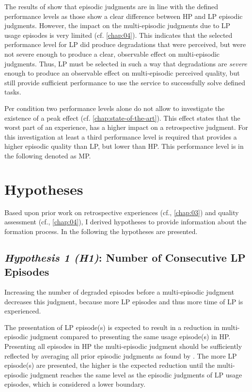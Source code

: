 The results of \cite{moller_single-call_2011} show that episodic judgments are in line with the defined performance levels as those show a clear difference between \ac{HP} and \ac{LP} episodic judgments.
However, the impact on the multi-episodic judgments due to \ac{LP} usage episodes is very limited (cf. \autoref{chap:04}).
This indicates that the selected performance level for \ac{LP} did produce degradations that were perceived, but were not severe enough to produce a clear, observable effect on multi-episodic judgments.
Thus, \ac{LP} must be selected in such a way that degradations are \emph{severe} enough to produce an observable effect on multi-episodic perceived quality, but still provide sufficient performance to use the service to successfully solve defined tasks.

Per condition two performance levels alone do not allow to investigate the existence of a peak effect (cf. \autoref{chap:state-of-the-art}).
This effect states that the worst part of an experience, has a higher impact on a retrospective judgment.
For this investigation at least a third performance level is required that provides a higher episodic quality than \ac{LP}, but lower than \ac{HP}.
This performance level is in the following denoted as \acf{MP}.

\section{Hypotheses}
Based upon prior work on retrospective experiences (cf., \autoref{chap:03}) and quality assessment (cf., \autoref{chap:04}), I derived \unit[6]{hypotheses} to provide information about the formation process.
In the following the \unit[6]{hypotheses} are presented.

\subsection*{\emph{Hypothesis 1 (H1)}: Number of Consecutive \ac{LP} Episodes}
\begin{hypothesis}[Hypothesis H1]
Increasing the number of degraded episodes before a multi-episodic judgment decreases this judgment, because more \ac{LP} episodes and thus more time of \ac{LP} is experienced.
\end{hypothesis}

The presentation of \ac{LP} episode(s) is expected to result in a reduction in multi-episodic judgment compared to presenting the same usage episode(s) in \ac{HP}.
Presenting all episodes in \ac{HP} the multi-episodic judgment should be sufficiently reflected by averaging all prior episodic judgments as found by \cite{moller_single-call_2011}.
The more \ac{LP} episode(s) are presented, the higher is the expected reduction until the multi-episodic judgment reaches the same level as the episodic judgments of \ac{LP} usage episodes, which is considered a lower boundary.

